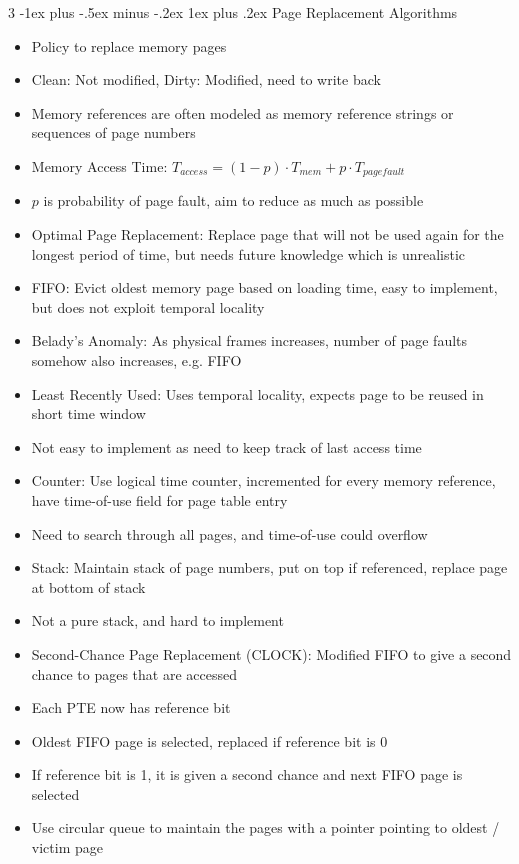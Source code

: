 \documentclass[10pt, landscape]{article}
\makeatletter
\renewcommand{\subsection}{\@startsection{subsection}{3}{0mm}%
                                {-1ex plus -.5ex minus -.2ex}%
                                {1ex plus .2ex}%
                                {\normalfont\small\bfseries}}%
\makeatother
\begin{document}
\begin{multicols*}{3}
\subsection{Page Replacement Algorithms}
\begin{itemize}
    \item Policy to replace memory pages
    \item Clean: Not modified, Dirty: Modified, need to write back
    \item Memory references are often modeled as memory reference strings or sequences of page numbers
    \item Memory Access Time: $T_{access}=(1-p)\cdot T_{mem}+p\cdot T_{pagefault}$
    \item $p$ is probability of page fault, aim to reduce as much as possible
    \item Optimal Page Replacement: Replace page that will not be used again for the longest period of time, but needs future knowledge which is unrealistic
    \item FIFO: Evict oldest memory page based on loading time, easy to implement, but does not exploit temporal locality
    \item Belady's Anomaly: As physical frames increases, number of page faults somehow also increases, e.g. FIFO
    \item Least Recently Used: Uses temporal locality, expects page to be reused in short time window
    \item Not easy to implement as need to keep track of last access time
    \item Counter: Use logical time counter, incremented for every memory reference, have time-of-use field  for page table entry
    \item Need to search through all pages, and time-of-use could overflow
    \item Stack: Maintain stack of page numbers, put on top if referenced, replace page at bottom of stack
    \item Not a pure stack, and hard to implement
    \item Second-Chance Page Replacement (CLOCK): Modified FIFO to give a second chance to pages that are accessed
    \item Each PTE now has reference bit
    \item Oldest FIFO page is selected, replaced if reference bit is 0
    \item If reference bit is 1, it is given a second chance and next FIFO page is selected
    \item Use circular queue to maintain the pages with a pointer pointing to oldest / victim page
\end{itemize}


\end{multicols*}
\end{document}
